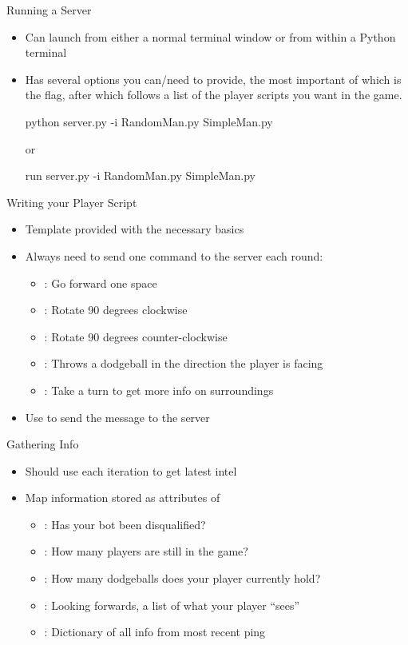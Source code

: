 \documentclass[pdf, aspectratio=169, 12pt]{beamer}
\begin{document}
\begin{frame}[fragile]{Running a Server}
	\begin{itemize}
		\item Can launch from either a normal terminal window or from within a Python terminal
		\item Has several options you can/need to provide, the most important of which is the  flag, after which follows a list of the player scripts you want in the game.
			\begin{pythoncode}
				python server.py -i RandomMan.py SimpleMan.py
			\end{pythoncode}
			or
			\begin{pythoncode}
				run server.py -i RandomMan.py SimpleMan.py
			\end{pythoncode}
	\end{itemize}
\end{frame}

\begin{frame}{Writing your Player Script}
	\begin{itemize}
		\item Template provided with the necessary basics
		\item Always need to send one command to the server each round:
			\begin{itemize}
				\item {}: Go forward one space
				\item {}: Rotate 90 degrees clockwise
				\item {}: Rotate 90 degrees counter-clockwise
				\item {}: Throws a dodgeball in the direction the player is facing
				\item {}: Take a turn to get more info on surroundings
			\end{itemize}
		\item Use  to send the message to the server
	\end{itemize}
\end{frame}

\begin{frame}{Gathering Info}
	\begin{itemize}
		\item Should use  each iteration to get latest intel
		\item Map information stored as attributes of 
			\begin{itemize}
				\item {}: Has your bot been disqualified?
				\item {}: How many players are still in the game?
				\item {}: How many dodgeballs does your player currently hold?
				\item {}: Looking forwards, a list of what your player ``sees''
				\item {}: Dictionary of all info from most recent ping
			\end{itemize}
	\end{itemize}
\end{frame}
\end{document}
